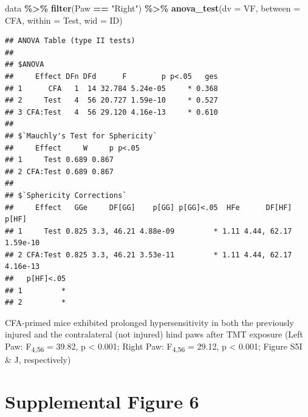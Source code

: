 \documentclass[
]{book}
\newenvironment{Shaded}{\begin{snugshade}}{\end{snugshade}}
\newcommand{\AttributeTok}[1]{\textcolor[rgb]{0.13,0.29,0.53}{#1}}
\newcommand{\FunctionTok}[1]{\textcolor[rgb]{0.13,0.29,0.53}{\textbf{#1}}}
\newcommand{\NormalTok}[1]{#1}
\newcommand{\SpecialCharTok}[1]{\textcolor[rgb]{0.81,0.36,0.00}{\textbf{#1}}}
\newcommand{\StringTok}[1]{\textcolor[rgb]{0.31,0.60,0.02}{#1}}
\begin{document}
\begin{Shaded}
\begin{Highlighting}[]
\NormalTok{data }\SpecialCharTok{\%\textgreater{}\%}
  \FunctionTok{filter}\NormalTok{(Paw }\SpecialCharTok{==} \StringTok{"Right"}\NormalTok{) }\SpecialCharTok{\%\textgreater{}\%}
  \FunctionTok{anova\_test}\NormalTok{(}\AttributeTok{dv =}\NormalTok{ VF, }\AttributeTok{between =}\NormalTok{ CFA, }\AttributeTok{within =}\NormalTok{ Test, }\AttributeTok{wid =}\NormalTok{ ID)}
\end{Highlighting}
\end{Shaded}

\begin{verbatim}
## ANOVA Table (type II tests)
## 
## $ANOVA
##     Effect DFn DFd      F        p p<.05   ges
## 1      CFA   1  14 32.784 5.24e-05     * 0.368
## 2     Test   4  56 20.727 1.59e-10     * 0.527
## 3 CFA:Test   4  56 29.120 4.16e-13     * 0.610
## 
## $`Mauchly's Test for Sphericity`
##     Effect     W     p p<.05
## 1     Test 0.689 0.867      
## 2 CFA:Test 0.689 0.867      
## 
## $`Sphericity Corrections`
##     Effect   GGe     DF[GG]    p[GG] p[GG]<.05  HFe      DF[HF]    p[HF]
## 1     Test 0.825 3.3, 46.21 4.88e-09         * 1.11 4.44, 62.17 1.59e-10
## 2 CFA:Test 0.825 3.3, 46.21 3.53e-11         * 1.11 4.44, 62.17 4.16e-13
##   p[HF]<.05
## 1         *
## 2         *
\end{verbatim}

CFA-primed mice exhibited prolonged hypersensitivity in both the previously injured and the contralateral (not injured) hind paws after TMT exposure (Left Paw: F\textsubscript{4,56} = 39.82, p \textless{} 0.001; Right Paw: F\textsubscript{4,56} = 29.12, p \textless{} 0.001; Figure S5I \& J, respectively)

\chapter*{Supplemental Figure 6}\label{supplemental-figure-6}
\end{document}
